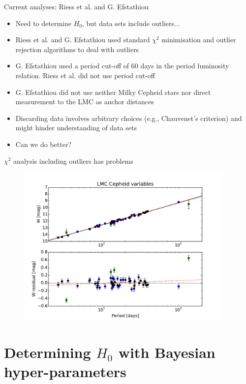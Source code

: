 \documentclass{beamer}
\begin{document}
\begin{frame}{Current analyses: Riess et al. and G. Efstathiou}
\begin{itemize}
\item Need to determine $H_0$, but data sets include outliers...
\item Riess et al. and G. Efstathiou used standard $\chi^2$ minimisation and outlier rejection algorithms to deal with outliers
\item G. Efstathiou used a period cut-off of $60$ days in the period luminosity relation. Riess et al. did not use period cut-off
\item G. Efstathiou did not use neither Milky Cepheid stars nor direct measurement to the LMC as anchor distances
\item Discarding data involves arbitrary choices (e.g., Chauvenet's criterion) and might hinder understanding of data sets
\item Can we do better? 
\end{itemize}
\end{frame}

\begin{frame}{$\chi^2$ analysis including outliers has problems}
\begin{figure}[hbtp]
\centering
\includegraphics[width=0.95\textwidth]{effective_HP_cepheids_LMC.pdf}
\end{figure}
\end{frame}


\section{Determining $H_0$ with Bayesian hyper-parameters}
\end{document}
